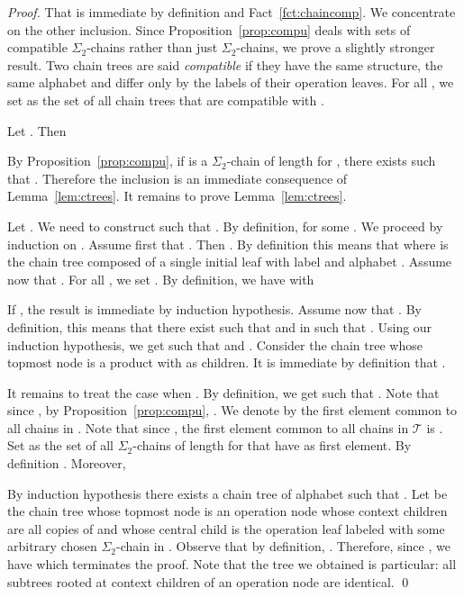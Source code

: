 \documentclass[envcountsame]{llncs}
\newcommand\Ts{\ensuremath{\mathcal{T}}\xspace}
\newcommand{\sic}[1]{\ensuremath{\Sigma_{#1}}\xspace}
\newcommand\chain{chain\xspace}
\newcommand\qchain[1]{\ensuremath{\sic{#1}}-chain\xspace}
\newcommand\chains{chains\xspace}
\newcommand\qchains[1]{\ensuremath{\sic{#1}}-chains\xspace}
\newcommand\dchain{\qchain{2}}
\newcommand\dchains{\qchains{2}}
\begin{document}
\begin{proof}
  That  is immediate
  by definition and Fact~\ref{fct:chaincomp}. We concentrate on the other
  inclusion. Since Proposition~\ref{prop:compu} deals with sets of
  compatible \dchains rather than just \dchains, we prove a slightly
  stronger result. Two \chain trees are said \emph{compatible} if they
  have the same structure, the same alphabet and differ only by the
  labels of their operation leaves. For all , we set
    as the set of all \chain trees that are
  compatible with .

  \begin{lemma} \label{lem:ctrees}
    Let . Then 
  \end{lemma}

  By Proposition~\ref{prop:compu}, if  is a \dchain of length
   for , there exists  such that . Therefore the inclusion
   is an immediate
  consequence of Lemma~\ref{lem:ctrees}. It remains to prove
  Lemma~\ref{lem:ctrees}.

  Let . We
  need to construct  such that . By definition, 
  for some . We proceed by induction on . Assume first
  that . Then . By definition
  this means that  where  is the \chain tree
  composed of a single initial leaf with label  and
  alphabet . Assume now that . For all , we
  set . By definition, we
  have  with
  
  If , the result is immediate by induction
  hypothesis. Assume now that . By definition, this means
  that there exist  such that  and  in
   such that . Using our induction
  hypothesis, we get  such that 
  and . Consider  the \chain tree
  whose topmost node is a product with  as children. It is
  immediate by definition that .

  It remains to treat the case when . By definition, we
  get  such that . Note that since , by Proposition~\ref{prop:compu},
  . We denote by  the first element
  common to all \chains in . Note that since , the first element common to all \chains in \Ts is
  . Set  as the set of all \dchains of
  length  for  that have  as first element. By
  definition . Moreover,
  
  By induction hypothesis there exists a \chain tree  of
  alphabet  such that . Let  be
  the \chain tree whose topmost node is an operation node whose context
  children are all copies of  and whose central child is the
  operation leaf labeled with some arbitrary chosen \dchain in
  . Observe that by definition, 
  . Therefore, since , we have  which
  terminates the proof. Note that the tree we obtained is particular: all
  subtrees rooted at context children of an operation node are identical. \qed
\end{proof}
\end{document}
